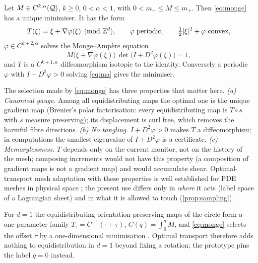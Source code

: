 \begin{theorem}\label{thm:ot}
Let $M\in C^{k,\alpha}(\mathcal{Q})$, $k\ge0$, $0<\alpha<1$, with $0<m_-\le M\le m_+$. Then \eqref{eq:monge} has a unique
minimiser. It has the form
\begin{equation}\label{eq:brenier}
T(\xi)=\xi+\nabla\varphi(\xi)\pmod{\Z^d},\qquad \varphi\ \text{periodic},\qquad \tfrac12\abs{\xi}^2+\varphi\ \text{convex},
\end{equation}
$\varphi\in C^{k+2,\alpha}$ solves the Monge--Amp\`ere equation
\begin{equation}\label{eq:ma}
M\big(\xi+\nabla\varphi(\xi)\big)\,\det\big(I+D^2\varphi(\xi)\big)=1 ,
\end{equation}
and $T$ is a $C^{k+1,\alpha}$ diffeomorphism isotopic to the identity. Conversely a periodic $\varphi$ with
$I+D^2\varphi>0$ solving \eqref{eq:ma} gives the minimiser.
\end{theorem}

The selection made by \eqref{eq:monge} has three properties that matter here. \emph{(a) Canonical gauge.} Among all
equidistributing maps the optimal one is the unique gradient map (Brenier's polar factorisation: every
equidistributing map is $T\circ s$ with $s$ measure preserving); its displacement is curl free, which removes the
harmful fibre directions. \emph{(b) No tangling.} $I+D^2\varphi>0$ makes $T$ a diffeomorphism; in computations the
smallest eigenvalue of $I+D^2\varphi$ is a certificate. \emph{(c) Memorylessness.} $T$ depends only on the current
monitor, not on the history of the mesh; composing increments would not have this property (a composition of
gradient maps is not a gradient map) and would accumulate shear. Optimal-transport mesh adaptation with these
properties is well established for PDE meshes in physical space
\cite{BuddWilliams2006,BuddHuangRussell2009,Delzanno2008,Weller2016}; the present use differs only in \emph{where}
it acts (label space of a Lagrangian sheet) and in what it is allowed to touch (\cref{prop:sampling}).

\begin{proposition}[$d=1$: monotone rearrangement]\label{prop:ot1d}
For $d=1$ the equidistributing orientation-preserving maps of the circle form a one-parameter family
$T_\tau=C^{-1}(\cdot+\tau)$, $C(q)=\int_{0}^{q}M$, and \eqref{eq:monge} selects the offset $\tau$ by a
one-dimensional minimisation \cite{DelonSalomonSobolevski2010}. Optimal transport therefore adds nothing to
equidistribution in $d=1$ beyond fixing a rotation; the prototype pins the label $q=0$ instead.
\end{proposition}

